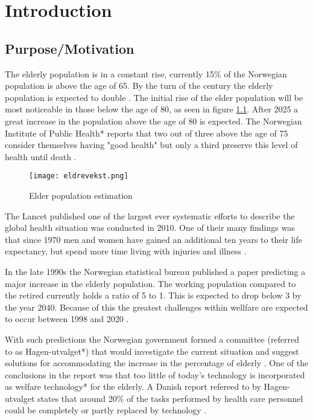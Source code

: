 
\chapter{Introduction} %

\label{Chapter1} %


\section{Purpose/Motivation}
The elderly population is in a constant rise, currently 15\% of the Norwegian population is above the age of 65. By the turn of the century the elderly population is expected to double \cite{elder}. The initial rise of the elder population will be most noticeable in those below the age of 80, as seen in figure \ref{fig:elderPopulation}. After 2025 a great increase in the population above the age of 80 is expected. The Norwegian Institute of Public Health* reports that two out of three above the age of 75 consider themselves having "good health" but only a third preserve this level of health until death \cite{elder}.

\begin{figure}[h!]
	\centering
		\label{fig:elderPopulation}
		\texttt{[image: eldrevekst.png]}
		\caption{\footnotesize Elder population estimation \cite{elder}}
\end{figure}
The Lancet published one of the largest ever systematic efforts to describe the global health situation was conducted in 2010. One of their many findings was that since 1970 men and women have gained an additional ten years to their life expectancy, but spend more time living with injuries and illness \cite{globalBurden}. %

In the late 1990s the Norwegian statistical bureau published a paper predicting a major increase in the elderly population. The working population compared to the retired currently holds a ratio of 5 to 1. This is expected to drop below 3 by the year 2040. Because of this the greatest challenges within wellfare are expected to occur between 1998 and 2020 \cite{eldreEksplosjon}. 

With such predictions the Norwegian government formed a committee (referred to as Hagen-utvalget*) that would investigate the current situation and suggest solutions for accommodating the increase in the percentage of elderly \cite{haagen}. One of the conclusions in the report was that too little of today's technology is incorporated as welfare technology* for the elderly. A Danish report refereed to by Hagen-utvalget states that around 20\% of the tasks performed by health care personnel could be completely or partly replaced by technology \cite{kmd}. 

